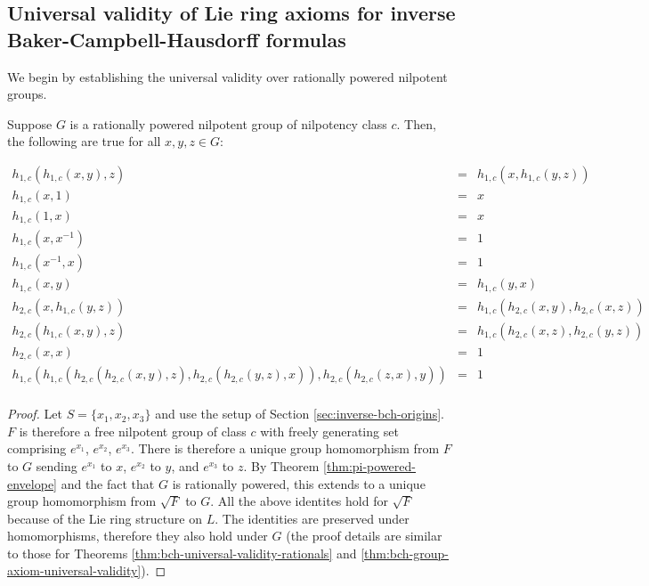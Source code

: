 \documentclass{ucetd}
\begin{document}
\subsection{Universal validity of Lie ring axioms for inverse Baker-Campbell-Hausdorff formulas}

We begin by establishing the universal validity over rationally
powered nilpotent groups.

\begin{theorem}\label{thm:inverse-bch-lie-ring-axiom-universal-validity}
  Suppose $G$ is a rationally powered nilpotent group of nilpotency
  class $c$. Then, the following are true for all $x,y,z \in G$:
    
  \begin{eqnarray*}
    h_{1,c}(h_{1,c}(x,y),z) & = & h_{1,c}(x,h_{1,c}(y,z)) \\
    h_{1,c}(x,1) & = & x \\
    h_{1,c}(1,x) & = & x \\
    h_{1,c}(x,x^{-1}) & = & 1 \\
    h_{1,c}(x^{-1},x) & = & 1 \\
    h_{1,c}(x,y) & = & h_{1,c}(y,x)\\
    h_{2,c}(x,h_{1,c}(y,z)) & = & h_{1,c}(h_{2,c}(x,y),h_{2,c}(x,z))\\
    h_{2,c}(h_{1,c}(x,y),z) & = & h_{1,c}(h_{2,c}(x,z),h_{2,c}(y,z))\\
    h_{2,c}(x,x) & = & 1 \\
    h_{1,c}(h_{1,c}(h_{2,c}(h_{2,c}(x,y),z),h_{2,c}(h_{2,c}(y,z),x)),h_{2,c}(h_{2,c}(z,x),y)) & = & 1 \\
  \end{eqnarray*}
\end{theorem}

\begin{proof}
  Let $S = \{x_1,x_2,x_3\}$ and use the setup of Section
  \ref{sec:inverse-bch-origins}. $F$ is therefore a free nilpotent
  group of class $c$ with freely generating set comprising $e^{x_1}$,
  $e^{x_2}$, $e^{x_3}$. There is therefore a unique group homomorphism
  from $F$ to $G$ sending $e^{x_1}$ to $x$, $e^{x_2}$ to $y$, and
  $e^{x_3}$ to $z$. By Theorem \ref{thm:pi-powered-envelope} and the
  fact that $G$ is rationally powered, this extends to a unique group
  homomorphism from $\sqrt{F}$ to $G$. All the above identites hold
  for $\sqrt{F}$ because of the Lie ring structure on $L$. The
  identities are preserved under homomorphisms, therefore they also
  hold under $G$ (the proof details are similar to those for Theorems
  \ref{thm:bch-universal-validity-rationals} and
  \ref{thm:bch-group-axiom-universal-validity}).
\end{proof}
\end{document}
